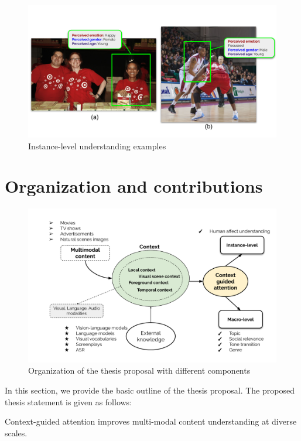 \begin{figure}
 \centering
    \includegraphics[width=\textwidth]{figures/instance_level_scale_understanding.pdf}
    \caption{Instance-level understanding examples}
    \label{instance_scale_understanding}
\end{figure}


\section{Organization and contributions}

\begin{figure}[h!]
    \centering
        \includegraphics[width=\textwidth]{figures/Overview_diagram.pdf}
        \caption{Organization of the thesis proposal with different components}
        \label{proposalorganization}
\end{figure}

In this section, we provide the basic outline of the thesis proposal. The proposed thesis statement is given as follows:

\begin{tcolorbox}[width=\textwidth]
Context-guided attention improves multi-modal content understanding at diverse scales.
\end{tcolorbox}


